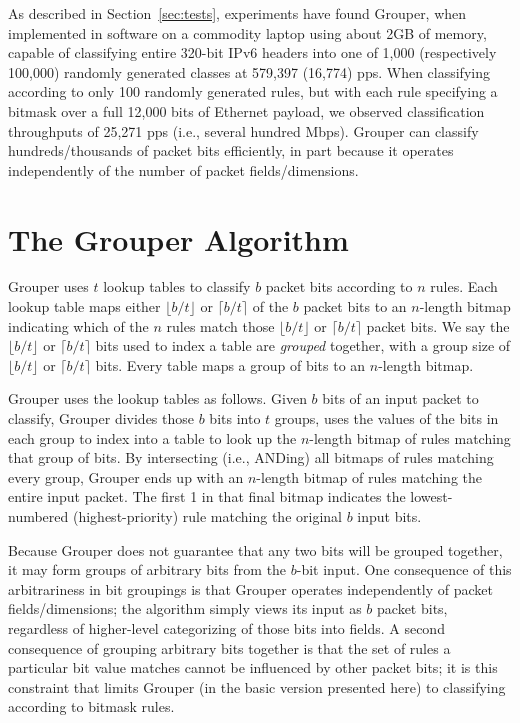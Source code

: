 \documentclass[10pt, conference, compsocconf]{IEEEtran}
\begin{document}
As described in Section~\ref{sec:tests}, experiments have found Grouper, when
implemented in software on a commodity laptop using about 2GB of memory, capable
of classifying entire 320-bit IPv6 headers into one of 1,000 (respectively
100,000) randomly generated classes at 579,397 (16,774) pps.  When classifying
according to only 100 randomly generated rules, but with each rule specifying a
bitmask over a full 12,000 bits of Ethernet payload, we observed classification
throughputs of 25,271 pps (i.e., several hundred Mbps).  Grouper can classify
hundreds/thousands of packet bits efficiently, in part because it operates
independently of the number of packet fields/dimensions.

\section{The Grouper Algorithm}
\label{sec:algorithm}
Grouper uses $t$ lookup tables to classify $b$ packet bits according to $n$
rules. %
Each lookup table maps either $\lfloor b/t\rfloor$ or $\lceil b/t\rceil$ of the
$b$ packet bits to an $n$-length bitmap indicating which of the $n$ rules match
those $\lfloor b/t\rfloor$ or $\lceil b/t\rceil$ packet bits.  We say the
$\lfloor b/t\rfloor$ or $\lceil b/t\rceil$ bits used to index a table are {\em
  grouped} together, with a group size of $\lfloor b/t\rfloor$ or $\lceil
b/t\rceil$ bits.  Every table maps a group of bits to an $n$-length bitmap.

Grouper uses the lookup tables as follows.  Given $b$ bits of an input packet to
classify, Grouper divides those $b$ bits into $t$ groups, uses the values of the
bits in each group to index into a table to look up the $n$-length bitmap of
rules matching that group of bits.  By intersecting (i.e., ANDing) all bitmaps
of rules matching every group, Grouper ends up with an $n$-length bitmap of
rules matching the entire input packet.  The first 1 in that final bitmap
indicates the lowest-numbered (highest-priority) rule matching the original $b$
input bits.

Because Grouper does not guarantee that any two bits will be grouped together,
it may form groups of arbitrary bits from the $b$-bit input.  One consequence of
this arbitrariness in bit groupings is that Grouper operates independently of
packet fields/dimensions; the algorithm simply views its input as $b$ packet
bits, regardless of higher-level categorizing of those bits into fields. A
second consequence of grouping arbitrary bits together is that the set of rules
a particular bit value matches cannot be influenced by other packet bits; it is
this constraint that limits Grouper (in the basic version presented here) to
classifying according to bitmask rules.
\end{document}
